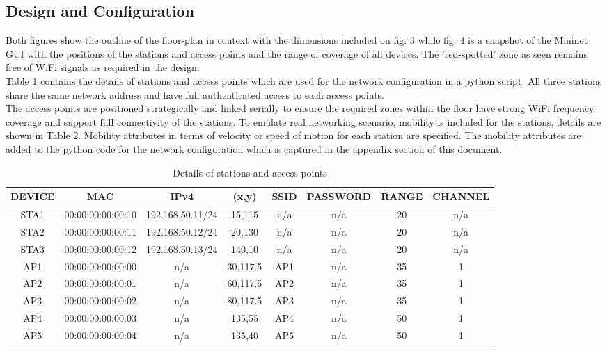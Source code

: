 \documentclass{article}
\begin{document}
\subsection{Design and Configuration}
Both figures show the outline of the floor-plan in context with the dimensions included on fig. 3 while fig. 4 is a snapshot of the Mininet GUI with the positions of the stations and access points and the range of coverage of all devices. The 'red-spotted' zone as seen remains free of WiFi signals as required in the design. \\ Table 1 contains the details of stations and access points which are used for the network configuration in a python script. All three stations share the same network address and have full authenticated access to each access points. \\ The access points are positioned strategically and linked serially to ensure the required zones within the floor have strong WiFi frequency coverage and support full connectivity of the stations. To emulate real networking scenario, mobility is included for the stations, details are shown in Table 2. Mobility attributes in terms of velocity or speed of motion for each station are specified. The mobility attributes are added to the python code for the network configuration which is captured in the appendix section of this document.
  	\begin{table}[h]
        		\begin{tabular}{|c|c|c|c|c|c|c|c|}
        			\hline
        			DEVICE & MAC & IPv4 & (x,y) & SSID & PASSWORD & RANGE & CHANNEL\\
        			\hline
        			STA1 & 00:00:00:00:00:10 & 192.168.50.11/24 & 15,115 & n/a & n/a & 20 & n/a \\
        			STA2 & 00:00:00:00:00:11 & 192.168.50.12/24 & 20,130 & n/a & n/a & 20 & n/a \\
       			STA3 & 00:00:00:00:00:12 & 192.168.50.13/24 & 140,10 & n/a & n/a & 20 & n/a \\
        			AP1 & 00:00:00:00:00:00 & n/a & 30,117.5 & AP1 & n/a & 35 & 1 \\
        			AP2 & 00:00:00:00:00:01 & n/a & 60,117.5 & AP2 & n/a & 35 & 1 \\
        			AP3 & 00:00:00:00:00:02 & n/a & 80,117.5 & AP3 & n/a & 35 & 1 \\
        			AP4 & 00:00:00:00:00:03 & n/a & 135,55 & AP4 & n/a & 50 & 1 \\
        			AP5 & 00:00:00:00:00:04 & n/a & 135,40 & AP5 & n/a & 50 & 1 \\
        			\hline
        		\end{tabular}
        \caption{Details of stations and access points}
        \label{tab:1}
    	\end{table}
\end{document}
